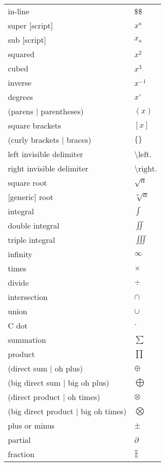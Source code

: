 \documentclass[12pt, a4paper]{article}
\begin{document}
\begin{longtable}{ll}
in-line & \$\$ \\
super [script] & $x^{a}$ \\
sub [script] & $x_{a}$ \\
squared & $x^{2} $ \\
cubed & $x^{3} $ \\
inverse & $x^{-1} $ \\
degrees & $x^{\circ}$ \\
(parens | parentheses) & $\left( x \right)$ \\
square brackets & $\left[ x \right] $ \\
(curly brackets | braces) & $\{  \}$ \\
left invisible delimiter & \textbackslash $\text{left.}$ \\
right invisible delimiter & \textbackslash $\text{right.}$ \\
square root & $\sqrt{a}$ \\
{[generic]} root & $\sqrt[n]{a}$ \\
integral & $\int$ \\
double integral & $\iint$ \\
triple integral & $\iiint$ \\
infinity & $\infty$ \\
times & $\times$ \\
divide & $\div$ \\
intersection & $\cap$ \\
union & $\cup$ \\
C dot & $\cdot$ \\
summation & $\sum$ \\
product & $\prod$ \\
(direct sum | oh plus) & $\oplus$ \\
(big direct sum | big oh plus) & $\bigoplus$ \\
(direct product | oh times) & $\otimes$ \\
(big direct product | big oh times) & $\bigotimes$ \\
plus or minus & $\pm$ \\
partial & $\partial$ \\
fraction & $\frac{a}{b}$ \\

\end{longtable}
\end{document}
